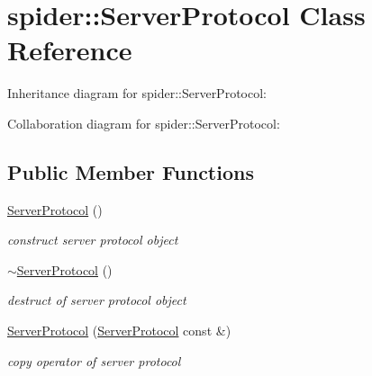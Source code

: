 \hypertarget{classspider_1_1_server_protocol}{}\section{spider\+:\+:Server\+Protocol Class Reference}
\label{classspider_1_1_server_protocol}


Inheritance diagram for spider\+:\+:Server\+Protocol\+:


Collaboration diagram for spider\+:\+:Server\+Protocol\+:
\subsection*{Public Member Functions}
\begin{DoxyCompactItemize}
\item 
\mbox{\label{classspider_1_1_server_protocol_af84520983479ef6e777da34cb58c2e24}} 
\hyperlink{classspider_1_1_server_protocol_af84520983479ef6e777da34cb58c2e24}{Server\+Protocol} ()
\begin{DoxyCompactList}\small\item\em construct server protocol object \end{DoxyCompactList}\item 
\mbox{\label{classspider_1_1_server_protocol_a958496b2694df2d62c37c363022af169}} 
\hyperlink{classspider_1_1_server_protocol_a958496b2694df2d62c37c363022af169}{$\sim$\+Server\+Protocol} ()
\begin{DoxyCompactList}\small\item\em destruct of server protocol object \end{DoxyCompactList}\item 
\mbox{\label{classspider_1_1_server_protocol_a866603c79adf96b04f6d9229b52280ed}} 
\hyperlink{classspider_1_1_server_protocol_a866603c79adf96b04f6d9229b52280ed}{Server\+Protocol} (\hyperlink{classspider_1_1_server_protocol}{Server\+Protocol} const \&)
\begin{DoxyCompactList}\small\item\em copy operator of server protocol \end{DoxyCompactList}\item 
\mbox{\label{classspider_1_1_server_protocol_ad3198a38584d643bd0eb9d86ca1213b4}} 

\end{DoxyCompactItemize}
